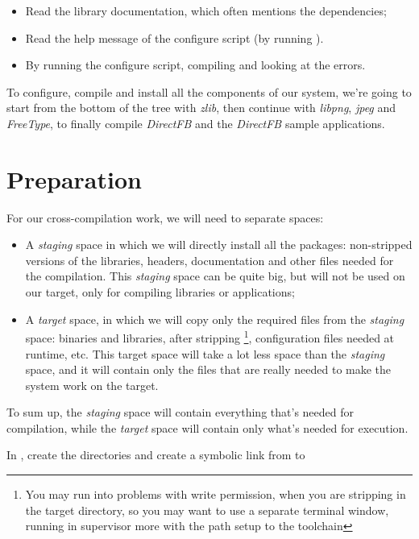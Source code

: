 \begin{itemize}
\item Read the library documentation, which often mentions the
  dependencies;
\item Read the help message of the configure script (by running
  ).
\item By running the configure script, compiling and looking at the
  errors.
\end{itemize}

To configure, compile and install all the components of our system,
we're going to start from the bottom of the tree with {\em zlib}, then
continue with {\em libpng}, \emph{jpeg} and \emph{FreeType}, to
finally compile \emph{DirectFB} and the \emph{DirectFB} sample
applications.

\clearpage
\section{Preparation}

For our cross-compilation work, we will need to separate spaces:
\begin{itemize}
\item A \emph{staging} space in which we will directly install all the
  packages: non-stripped versions of the libraries, headers,
  documentation and other files needed for the compilation. This
  \emph{staging} space can be quite big, but will not be used on our
  target, only for compiling libraries or applications;
\item A \emph{target} space, in which we will copy only the required
  files from the \emph{staging} space: binaries and libraries, after
  stripping \footnote{You may run into problems with write permission, when you are stripping
  in the target directory, so you may want to use a separate terminal window, running in supervisor
  more with the path setup to the toolchain}, configuration files needed at runtime, etc. This target
  space will take a lot less space than the \emph{staging} space, and
  it will contain only the files that are really needed to make the
  system work on the target.
\end{itemize}

To sum up, the {\em staging} space will contain everything that's
needed for compilation, while the {\em target} space will contain only
what's needed for execution.

In , create the  directories
and create a symbolic link from  to 

